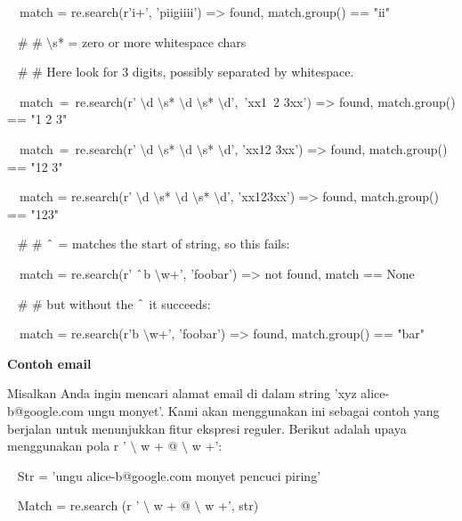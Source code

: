\begin{12pt}
\begin{12pt}
\noindent 
~~match = re.search(r'i+', 'piigiiii') =>  found, match.group() == "ii" \par
\vspace{12pt}
\noindent 
~  $  \#  $ $  \#  $  $  \setminus  $s* = zero or more whitespace chars \par
\noindent 
~  $  \#  $ $  \#  $ Here look for 3 digits, possibly separated by whitespace. \par
\noindent 
~~match~=~re.search(r' $  \setminus  $d $  \setminus  $s* $  \setminus  $d $  \setminus  $s* $  \setminus  $d',~'xx1~2   3xx') =>  found, match.group() == "1 2   3" \par
\noindent 
~~match~=~re.search(r' $  \setminus  $d $  \setminus  $s* $  \setminus  $d $  \setminus  $s* $  \setminus  $d', 'xx12  3xx') =>  found, match.group() == "12  3" \par
\noindent 
~~match = re.search(r' $  \setminus  $d $  \setminus  $s* $  \setminus  $d $  \setminus  $s* $  \setminus  $d', 'xx123xx') =>  found, match.group() == "123" \par
\vspace{12pt}
\noindent 
~  $  \#  $ $  \#  $  $  \string^  $ = matches the start of string, so this fails: \par
\noindent 
~~match = re.search(r' $  \string^  $b $  \setminus  $w+', 'foobar') =>  not found, match == None \par
\noindent 
~  $  \#  $ $  \#  $ but without the  $  \string^  $ it succeeds: \par
\noindent 
~~match = re.search(r'b $  \setminus  $w+', 'foobar') =>  found, match.group() == "bar" \par
\vspace{12pt}
\vspace{12pt}
\noindent 
{\fontsize{14pt}{14pt}\selectfont \textbf{Contoh email} \\} \par
Misalkan Anda ingin mencari alamat email di dalam string 'xyz alice-b@google.com ungu monyet'. Kami akan menggunakan ini sebagai contoh yang berjalan untuk menunjukkan fitur ekspresi reguler. Berikut adalah upaya menggunakan pola r ' $  \setminus  $ w + @  $  \setminus  $ w +': \par
\vspace{12pt}
\noindent 
~ Str = 'ungu alice-b@google.com monyet pencuci piring' \par
\noindent 
~ Match = re.search (r ' $  \setminus  $ w + @  $  \setminus  $ w +', str) \par
\noindent 

\end{12pt}
\end{12pt}
